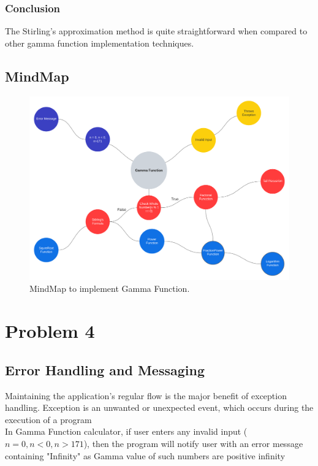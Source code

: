 \documentclass[12pt,a4paper]{report}
\begin{document}
\subsection{Conclusion}
The Stirling's approximation method is quite straightforward when compared to other gamma function implementation techniques.

\newpage
\section{MindMap}

\begin{figure}[h]
    \centering
    \includegraphics[width=1.0\linewidth]{Images/Mind map.png}
    \caption{MindMap to implement Gamma Function.}
    \label{fig:Exp_Data}
\end{figure}

\chapter{Problem 4}

\section{Error Handling and Messaging}
\indent\indent Maintaining the application's regular flow is the major benefit of exception handling. Exception is an unwanted or unexpected event, which occurs during the execution of a program\\

In Gamma Function calculator, if user enters any invalid input ($n = 0, n < 0, n > 171$), then the program will notify user with an error message containing "Infinity" as Gamma value of such numbers are positive infinity\\
\end{document}
